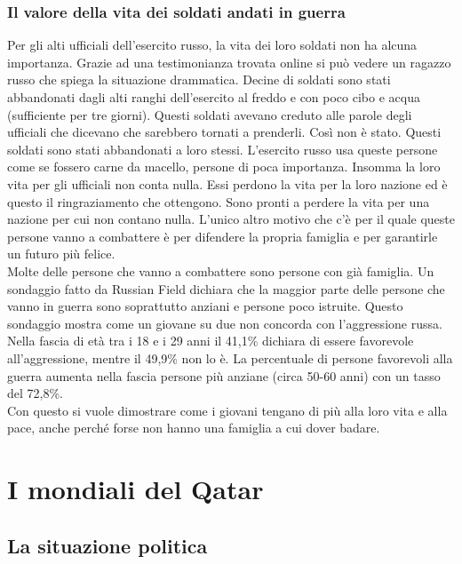\documentclass[a4paper, 12pt]{article}
\begin{document}

\subsubsection{Il valore della vita dei soldati andati in guerra}

Per gli alti ufficiali dell'esercito russo, la vita dei loro soldati non ha alcuna importanza. Grazie ad una testimonianza trovata online si può vedere un ragazzo russo che spiega la situazione drammatica. Decine di soldati sono stati abbandonati dagli alti ranghi dell'esercito al freddo e con poco cibo e acqua (sufficiente per tre giorni). Questi soldati avevano creduto alle parole degli ufficiali che dicevano che sarebbero tornati a prenderli. Così non è stato. Questi soldati sono stati abbandonati a loro stessi. L'esercito russo usa queste persone come se fossero carne da macello, persone di poca importanza. Insomma la loro vita per gli ufficiali non conta nulla. Essi perdono la vita per la loro nazione ed è questo il ringraziamento che ottengono. Sono pronti a perdere la vita per una nazione per cui non contano nulla. L'unico altro motivo che c'è per il quale queste persone vanno a combattere è per difendere la propria famiglia e per garantirle un futuro più felice. \\ Molte delle persone che vanno a combattere sono persone con già famiglia. Un sondaggio fatto da Russian Field dichiara che la maggior parte delle persone che vanno in guerra sono soprattutto anziani e persone poco istruite. Questo sondaggio mostra come un giovane su due non concorda con l'aggressione russa. Nella fascia di età tra i 18 e i 29 anni il 41,1\% dichiara di essere favorevole all'aggressione, mentre il 49,9\% non lo è. La percentuale di persone favorevoli alla guerra aumenta nella fascia persone più anziane (circa 50-60 anni) con un tasso del 72,8\%. \\ Con questo si vuole dimostrare come i giovani tengano di più alla loro vita e alla pace, anche perché forse non hanno una famiglia a cui dover badare.

\section{I mondiali del Qatar}

\subsection{La situazione politica}
\end{document}

